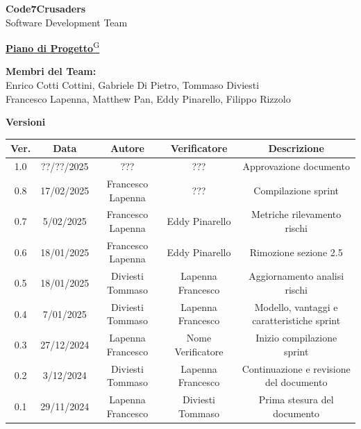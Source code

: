 \documentclass{article}
\begin{document}
\begin{titlepage}
    {\Huge \textbf{Code7Crusaders}}\\
    \vspace{0.5cm}
    {\Large Software Development Team}\\
    \vspace{2cm}

    {\large \href{https://code7crusaders.github.io/docs/RTB/documentazione_interna/glossario.html#piano-di-progetto}{\textbf{Piano di Progetto}\textsuperscript{G}}}\\
    \vspace{5cm}


    \textbf{Membri del Team:}\\
    Enrico Cotti Cottini, Gabriele Di Pietro, Tommaso Diviesti \\
    Francesco Lapenna, Matthew Pan, Eddy Pinarello, Filippo Rizzolo \\
    \vspace{0.5cm}

    \vspace{1cm}
\end{titlepage}



\newpage
\begin{table}[h!]
\centering
\textbf{Versioni} \\ %
\vspace{2mm} %
\begin{tabular}{|c|c|c|c|c|}
    \hline
    \textbf{Ver.} & \textbf{Data} & \textbf{Autore} & \textbf{Verificatore} & \textbf{Descrizione} \\
    \hline
    1.0 & ??/??/2025 & ??? & ??? & Approvazione documento \\
    0.8 & 17/02/2025 & Francesco Lapenna & ??? & Compilazione sprint \\
    0.7 & 5/02/2025 & Francesco Lapenna & Eddy Pinarello & Metriche rilevamento rischi \\
    0.6 & 18/01/2025 & Francesco Lapenna & Eddy Pinarello & Rimozione sezione 2.5 \\
    0.5 & 18/01/2025 & Diviesti Tommaso & Lapenna Francesco & Aggiornamento analisi rischi \\
    0.4 & 7/01/2025 & Diviesti Tommaso & Lapenna Francesco & Modello, vantaggi e caratteristiche sprint \\
    0.3 & 27/12/2024 & Lapenna Francesco & Nome Verificatore & Inizio compilazione sprint \\
    0.2 & 3/12/2024 & Diviesti Tommaso & Lapenna Francesco & Continuazione e revisione del documento \\
    0.1 & 29/11/2024 & Lapenna Francesco & Diviesti Tommaso & Prima stesura del documento \\
    \hline
\end{tabular}
\end{table}
\end{document}
